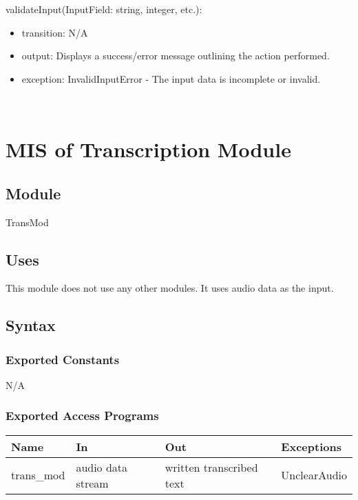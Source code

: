 \documentclass[12pt, titlepage]{article}
\begin{document}
\noindent validateInput(InputField: string, integer, etc.):
\begin{itemize}
\item transition: N/A
\item output: Displays a success/error message outlining the action performed.
\item exception: InvalidInputError - The input data is incomplete or invalid.
\end{itemize}

\newpage
~\newpage


  
\section{MIS of Transcription Module} \label{trans_mod}

\subsection{Module}
TransMod

\subsection{Uses}

This module does not use any other modules. It uses audio data as the input.

\subsection{Syntax}

\subsubsection{Exported Constants}

N/A

\subsubsection{Exported Access Programs}

\begin{center}
\begin{tabular}{p{2cm} p{4cm} p{4cm} p{2cm}}
\hline
\textbf{Name} & \textbf{In} & \textbf{Out} & \textbf{Exceptions} \\
\hline
trans_mod & audio data stream & written transcribed text & UnclearAudio & \\ 
\hline
\end{tabular}
\end{center}
\end{document}

